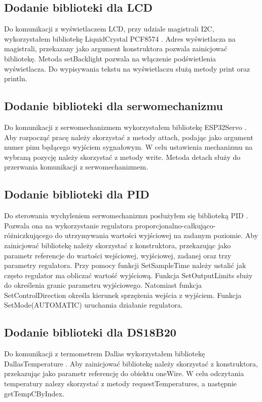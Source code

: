 \documentclass[11pt]{report}
\begin{document}
 \subsection{Dodanie biblioteki dla LCD}
 Do komunikacji z wyświetlaczem LCD, przy udziale magistrali I2C, wykorzystałem bibliotekę LiquidCrystal PCF8574 \cite{LCDlibrary}. Adres wyświetlacza na magistrali, przekazany jako argument konstruktora pozwala zainicjować bibliotekę. Metoda setBacklight pozwala na włączenie podświetlenia wyświetlacza. Do wypisywania tekstu na wyświetlaczu służą metody print oraz println.
 \subsection{Dodanie biblioteki dla serwomechanizmu}
 Do komunikacji z serwomechanizmem wykorzystałem bibliotekę ESP32Servo \cite{Servolibrary}. Aby rozpocząć pracę należy skorzystać z metody attach, podając jako argument numer pinu będącego wyjściem sygnałowym. W celu ustawienia mechanizmu na wybraną pozycję należy skorzystać z metody write. Metoda detach służy do przerwania komunikacji z serwomechanizmem.
 \subsection{Dodanie biblioteki dla PID}
 Do sterowania wychyleniem serwomechanizmu posłużyłem się biblioteką PID \cite{PIDlibrary}. Pozwala ona na wykorzystanie regulatora proporcjonalno-całkująco-różniczkującego do utrzymywania wartości wyjściowej na zadanym poziomie.
 Aby zainicjować bibliotekę  należy skorzystać z konstruktora, przekazując jako parametr referencje do wartości wejściowej, wyjściowej, zadanej oraz trzy parametry regulatora. Przy pomocy funkcji SetSampleTime należy ustalić jak często regulator ma obliczać wartość wyjściową. Funkcja SetOutputLimits służy do określenia granic parametru wyjściowego. Natomiast funkcja SetControlDirection określa kierunek sprzężenia wejścia z wyjściem. Funkcja SetMode(AUTOMATIC) uruchamia działanie regulatora.
 \subsection{Dodanie biblioteki dla DS18B20}
 Do komunikacji z termometrem Dallas wykorzystałem bibliotekę DallasTemperature \cite{dallaslibrary}. Aby zainicjować bibliotekę należy skorzystać z konstruktora, przekazując jako parametr referencję do obiektu oneWire. W celu odczytania temperatury nalezy skorzystać z metody requestTemperatures, a następnie getTempCByIndex.
\end{document}

